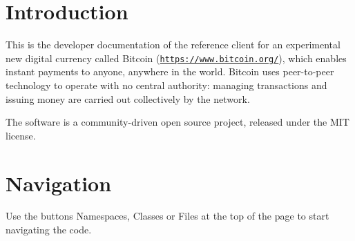 \hypertarget{index_intro_sec}{}\section{Introduction}\label{index_intro_sec}
This is the developer documentation of the reference client for an experimental new digital currency called Bitcoin (\href{https://www.bitcoin.org/}{\tt https\+://www.\+bitcoin.\+org/}), which enables instant payments to anyone, anywhere in the world. Bitcoin uses peer-\/to-\/peer technology to operate with no central authority\+: managing transactions and issuing money are carried out collectively by the network.

The software is a community-\/driven open source project, released under the M\+I\+T license.\hypertarget{index_Navigation}{}\section{Navigation}\label{index_Navigation}
Use the buttons {\ttfamily Namespaces}, {\ttfamily Classes} or {\ttfamily Files} at the top of the page to start navigating the code. 